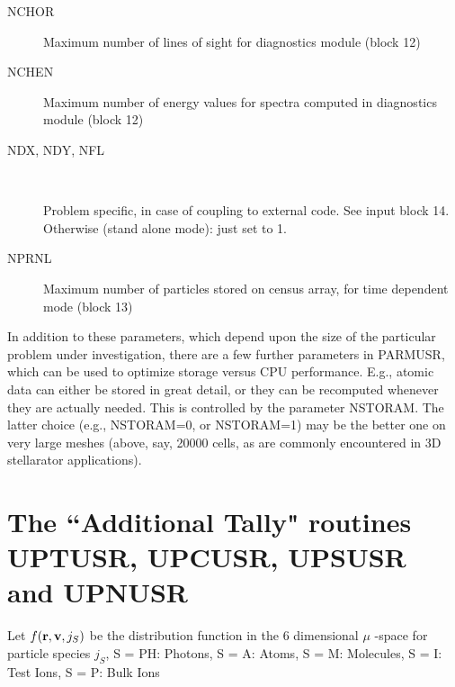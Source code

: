 \begin{description}
  \item[NCHOR] Maximum number of lines of sight for diagnostics module (block 12)
  \item[NCHEN] Maximum number of energy values for spectra computed in
        diagnostics module (block 12)
  \item[NDX, NDY, NFL]~ 

        Problem specific, in case of coupling to external code.
        See input block 14.
        Otherwise (stand alone mode): just set to 1.
  \item[NPRNL] Maximum number of particles stored on census array, for time
        dependent mode (block 13)
\end{description}

In addition to these parameters, which depend upon the size of the particular
problem under investigation, there are a few further parameters in PARMUSR,
which can be used to optimize storage versus CPU performance.
E.g., atomic data can either be stored in great detail, or they can be
recomputed whenever they are actually needed.
This is controlled by the parameter NSTORAM.
The latter choice (e.g., NSTORAM=0, or NSTORAM=1) may be the better one on very
large meshes (above, say, 20000 cells, as are commonly encountered in 3D
stellarator applications).

\newpage

\section{The ``Additional Tally" routines UPTUSR, UPCUSR, UPSUSR and UPNUSR}
\label{sec3.2}

Let $	f(\mathbf{r}, \mathbf{v},j_S)$ be the distribution function in the 6 dimensional
$\mu$ -space for particle species $j_S$, S = PH:
Photons, S = A: Atoms, S = M: Molecules, S = I: Test Ions, S = P:
Bulk Ions 

